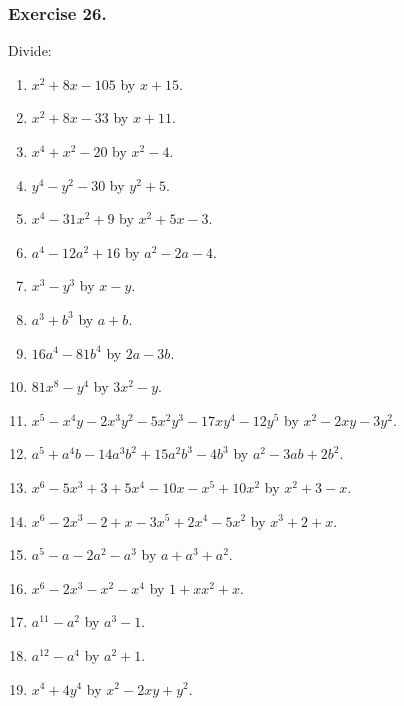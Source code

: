 \documentclass{book}
\begin{document}
\subsubsection*{Exercise 26.}

Divide:
\begin{enumerate}
\item $x^2+8x-105$ by $x+15$.

\item $x^2+8x-33$ by $x+11$.

\item $x^4+x^2-20$ by $x^2-4$.

\item $y^4-y^2-30$ by $y^2+5$.

\item $x^4-31x^2+9$ by $x^2+5x-3$.

\item $a^4-12a^2+16$ by $a^2-2a-4$.

\item $x^3-y^3$ by $x-y$.

\item $a^3+b^3$ by $a+b$.

\item $16a^4-81b^4$ by $2a-3b$.

\item $81x^8-y^4$ by $3x^2-y$.

\item $x^5-x^4y-2x^3y^2-5x^2y^3-17xy^4-12y^5$ by $x^2-2xy-3y^2$.

\item $a^5+a^4b-14a^3b^2+15a^2b^3-4b^3$ by $a^2-3ab+2b^2$.

\item $x^6 - 5x^3 + 3 + 5x^4 - 10x - x^5 + 10x^2$ by $x^2 + 3 -
x$.

\item $x^6 - 2x^3 - 2 + x - 3x^5 + 2x^4 - 5x^2$ by $x^3 + 2 + x$.

\item $a^5 - a - 2a^2 - a^3$ by $a + a^3 + a^2$.

\item $x^6 - 2x^3 - x^2 - x^4$ by $1 + xx^2 + x$.

\item $a^{11} - a^2$ by $a^3 - 1$.

\item $a^{12} - a^4$ by $a^2 + 1$.

\item $x^4 + 4y^4$ by $x^2 - 2xy + y^2$.


\end{enumerate}
\end{document}
